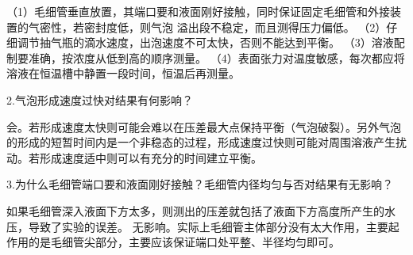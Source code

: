 \documentclass[4pt,a4papper]{article}
\begin{document}
（1）毛细管垂直放置，其端口要和液面刚好接触，同时保证固定毛细管和外接装置的气密性，若密封度低，则气泡 溢出段不稳定，而且测得压力偏低。 
（2）仔细调节抽气瓶的滴水速度，出泡速度不可太快，否则不能达到平衡。 
（3）溶液配制要准确，按浓度从低到高的顺序测量。 
（4）表面张力对温度敏感，每次都应将溶液在恒温槽中静置一段时间，恒温后再测量。 

2.气泡形成速度过快对结果有何影响？ 

会。若形成速度太快则可能会难以在压差最大点保持平衡（气泡破裂）。另外气泡的形成的短暂时间内是一个非稳态的过程，形成速度过快则可能对周围溶液产生扰动。若形成速度适中则可以有充分的时间建立平衡。 

3.为什么毛细管端口要和液面刚好接触？毛细管内径均匀与否对结果有无影响？ 

如果毛细管深入液面下方太多，则测出的压差就包括了液面下方高度所产生的水压，导致了实验的误差。 无影响。实际上毛细管主体部分没有太大作用，主要起作用的是毛细管尖部分，主要应该保证端口处平整、半径均匀即可。


\clearpage
\end{document}

